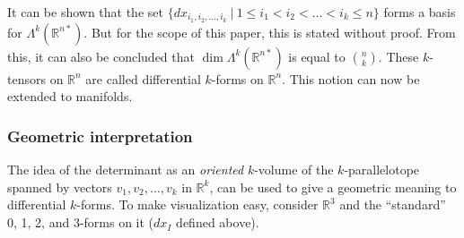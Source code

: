 \documentclass{article}
\theoremstyle{definition}
\theoremstyle{named}
\begin{document}
It can be shown that the set $\{dx_{i_1, i_2, \ldots, i_k} \ | \ 1 \leq i_1 < i_2 < \ldots < i_k \leq n\}$ forms a basis for $\Lambda^k(\mathbb{R}^{n*})$. But for the scope of this paper, this is stated without proof. From this, it can also be concluded that $\dim \Lambda^k(\mathbb{R}^{n*}) $ is equal to $ \binom{n}{k}$. These  $k$-tensors on $\mathbb{R}^n$ are called differential  $k$-forms on $\mathbb{R}^n$. This notion can now be extended to manifolds.

\subsubsection{Geometric interpretation}
The idea of the determinant as an \emph{oriented}  $k$-volume of the  $k$-parallelotope spanned by vectors $v_1, v_2, \ldots, v_k$ in $\mathbb{R}^k$, can be used to give a geometric meaning to differential  $k$-forms. To make visualization easy, consider $\mathbb{R}^3$ and the “standard” 0, 1, 2, and 3-forms on it ($dx_I$ defined above).
\end{document}

